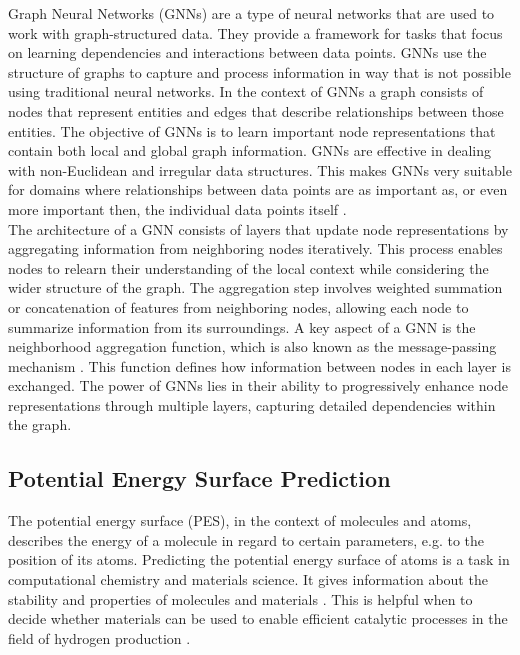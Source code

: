 Graph Neural Networks (GNNs) are a type of neural networks that are used to work with graph-structured data. They provide a framework for tasks that focus on learning dependencies and interactions between data points. GNNs use the structure of graphs to capture and process information in way that is not possible using traditional neural networks. In the context of GNNs a graph consists of nodes that represent entities and edges that describe relationships between those entities. The objective of GNNs is to learn important node representations that contain both local and global graph information. \cite{wu_comprehensive_2021} GNNs are effective in dealing with non-Euclidean and irregular data structures. This makes GNNs very suitable for domains where relationships between data points are as important as, or even more important then, the individual data points itself \cite{zhou_graph_2020}. \\

The architecture of a GNN consists of layers that update node representations by aggregating information from neighboring nodes iteratively. This process enables nodes to relearn their understanding of the local context while considering the wider structure of the graph. The aggregation step involves weighted summation or concatenation of features from neighboring nodes, allowing each node to summarize information from its surroundings. \cite{velickovic_everything_2023, xu_how_2019} A key aspect of a GNN is the neighborhood aggregation function, which is also known as the message-passing mechanism \cite{gasteiger_directional_2022}. This function defines how information between nodes in each layer is exchanged. The power of GNNs lies in their ability to progressively enhance node representations through multiple layers, capturing detailed dependencies within the graph. 

\subsection{Potential Energy Surface Prediction}
The potential energy surface (PES), in the context of molecules and atoms, describes the energy of a molecule in regard to certain parameters, e.g. to the position of its atoms.    
Predicting the potential energy surface of atoms is a task in computational chemistry and materials science. It gives information about the stability and properties of molecules and materials \cite{liu_computational_2023}. This is helpful when to decide whether materials can be used to enable efficient catalytic processes in the field of hydrogen production \cite{chen_waste-derived_2023}. 

